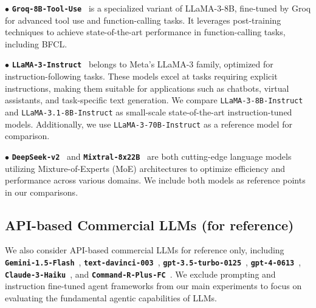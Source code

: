 \noindent$\bullet$ \textbf{\texttt{Groq-8B-Tool-Use}}~\cite{groq} is a specialized variant of LLaMA-3-8B, fine-tuned by Groq for advanced tool use and function-calling tasks. It leverages post-training techniques to achieve state-of-the-art performance in function-calling tasks, including BFCL.

\noindent$\bullet$ \textbf{\texttt{LLaMA-3-Instruct}}~\cite{dubey2024llama} belongs to Meta's LLaMA-3 family, optimized for instruction-following tasks. These models excel at tasks requiring explicit instructions, making them suitable for applications such as chatbots, virtual assistants, and task-specific text generation. We compare \texttt{LLaMA-3-8B-Instruct} and \texttt{LLaMA-3.1-8B-Instruct} as small-scale state-of-the-art instruction-tuned models. Additionally, we use \texttt{LLaMA-3-70B-Instruct} as a reference model for comparison.

\noindent$\bullet$ \textbf{\texttt{DeepSeek-v2}}~\cite{liu2024deepseek} and \textbf{\texttt{Mixtral-8x22B}}~\cite{jiang2024mixtral} are both cutting-edge language models utilizing Mixture-of-Experts (MoE) architectures to optimize efficiency and performance across various domains. We include both models as reference points in our comparisons.

\subsection{API-based Commercial LLMs (for reference)}
We also consider {API-based commercial LLMs} for reference only, including \textbf{\texttt{Gemini-1.5-Flash}}~\cite{reid2024gemini}, \textbf{\texttt{text-davinci-003}}~\cite{ouyang2022training}, \textbf{\texttt{gpt-3.5-turbo-0125}}~\cite{chatgpt}, \textbf{\texttt{gpt-4-0613}}~\cite{achiam2023gpt}, \textbf{\texttt{Claude-3-Haiku}}~\cite{claude-3}, and \textbf{\texttt{Command-R-Plus-FC}}~\cite{command-r-plus}.
We exclude prompting and instruction fine-tuned agent frameworks from our main experiments to focus on evaluating the fundamental agentic capabilities of LLMs.












